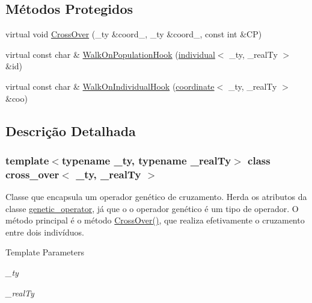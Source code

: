 \subsection*{Métodos Protegidos}
\begin{DoxyCompactItemize}
\item 
virtual void \hyperlink{classcross__over_af8d2e8a02552551f3edd692793816de3}{CrossOver} (\_\-ty \&coord\_, \_\-ty \&coord\_, const int \&CP)
\item 
virtual const char \& \hyperlink{classcross__over_a1a840a73fa36cc7f4f7e769f78d73e81}{WalkOnPopulationHook} (\hyperlink{classindividual}{individual}$<$ \_\-ty, \_\-realTy $>$ \&id)
\item 
virtual const char \& \hyperlink{classcross__over_a1febad7c46ec396173e099372d50839e}{WalkOnIndividualHook} (\hyperlink{classcoordinate}{coordinate}$<$ \_\-ty, \_\-realTy $>$ \&coo)
\end{DoxyCompactItemize}


\subsection{Descrição Detalhada}
\subsubsection*{template$<$typename \_\-ty, typename \_\-realTy$>$ class cross\_\-over$<$ \_\-ty, \_\-realTy $>$}

Classe que encapsula um operador genético de cruzamento. Herda os atributos da classe \hyperlink{classgenetic__operator}{genetic\_\-operator}, já que o o operador genético é um tipo de operador. O método principal é o método \hyperlink{classcross__over_ace759185adf45d08ece996286c69542f}{CrossOver()}, que realiza efetivamente o cruzamento entre dois indivíduos.


\begin{DoxyTemplParams}{Template Parameters}
\item[{\em \_\-ty}]\item[{\em \_\-realTy}]\end{DoxyTemplParams}


